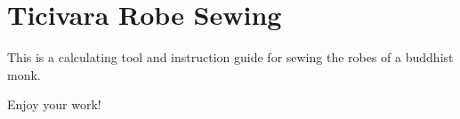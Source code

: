 \chapter{Ticivara Robe Sewing}

This is a calculating tool and instruction guide for sewing the robes of
a buddhist monk.

Enjoy your work!

